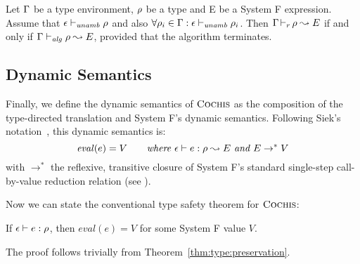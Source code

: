 % 

\begin{theorem}
Let $\Gamma$ be a type environment, $\rho$ be a type and E be a System F expression.
Assume that $\epsilon \vdash_{\mathit{unamb}} \rho$ and also $\forall \rho_i \in \Gamma: \epsilon \vdash_{\mathit{unamb}} \rho_i$.
Then $\Gamma \mathop{\vdash_{r}} \rho \leadsto E$ if and only if $\Gamma \vdash_{\mathit{alg}} \rho \leadsto E$,
provided that the algorithm terminates.
\end{theorem}

\subsection{Dynamic Semantics}
Finally, we define the dynamic semantics of $\textsc{Cochis}$ as the composition of
the type-directed translation and System F's dynamic semantics.  Following
Siek's notation~\cite{systemfg}, this dynamic semantics is:
\[ \mathit{eval}(e) = V \quad\quad \textit{where } \epsilon \vdash e:\rho \leadsto E \textit{ and } E \rightarrow^* V  \]
with $\rightarrow^*$ the reflexive, transitive closure of System F's standard single-step call-by-value reduction relation (see \cite[Chapter 23]{tapl}).

Now we can state the conventional type safety theorem for $\textsc{Cochis}$:
\begin{theorem}
If $\epsilon \vdash e:\rho$, then $\mathit{eval}(e) = V$ for
some System F value $V$.
\end{theorem}
The proof follows trivially from Theorem~\ref{thm:type:preservation}.


